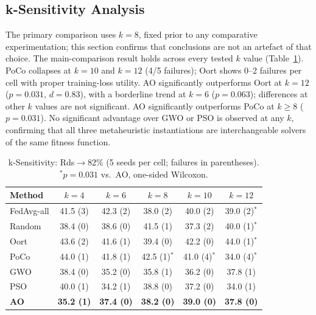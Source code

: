 \documentclass[conference]{IEEEtran}
\begin{document}
\subsection{k-Sensitivity Analysis}
The primary comparison uses $k=8$, fixed prior to any comparative experimentation; this section confirms that conclusions are not an artefact of that choice. The main-comparison result holds across every tested $k$ value (Table~\ref{tab:ksens}). PoCo collapses at $k=10$ and $k=12$ (4/5 failures); Oort shows 0--2 failures per cell with proper training-loss utility. AO significantly outperforms Oort at $k=12$ ($p=0.031$, $d=0.83$), with a borderline trend at $k=6$ ($p=0.063$); differences at other $k$ values are not significant. AO significantly outperforms PoCo at $k\geq8$ ($p=0.031$). No significant advantage over GWO or PSO is observed at any $k$, confirming that all three metaheuristic instantiations are interchangeable solvers of the same fitness function. 
\begin{table}[t]
\centering
\caption{k-Sensitivity: Rds$\to$82\% (5 seeds per cell; failures in parentheses). $^*p=0.031$ vs.\ AO, one-sided Wilcoxon.}
\label{tab:ksens}
\footnotesize
\setlength{\tabcolsep}{3pt}
\begin{tabular}{lccccc}
\toprule
Method & $k=4$ & $k=6$ & $k=8$ & $k=10$ & $k=12$ \\
\midrule
FedAvg-all & 41.5 (3) & 42.3 (2) & 38.0 (2) & 40.0 (2) & 39.0 (2)$^*$ \\
Random     & 38.4 (0) & 38.6 (0) & 41.5 (1) & 37.3 (2) & 40.0 (1)$^*$ \\
Oort       & 43.6 (2) & 41.6 (1) & 39.4 (0) & 42.2 (0) & 44.0 (1)$^*$ \\
PoCo       & 44.0 (1) & 41.8 (1) & 42.5 (1)$^*$ & 41.0 (4)$^*$ & 34.0 (4)$^*$ \\
GWO        & 38.4 (0) & 35.2 (0) & 35.8 (1) & 36.2 (0) & 37.8 (1) \\
PSO        & 40.0 (1) & 34.2 (1) & 38.8 (0) & 37.2 (0) & 34.0 (1) \\
\textbf{AO} & \textbf{35.2 (1)} & \textbf{37.4 (0)} & \textbf{38.2 (0)} & \textbf{39.0 (0)} & \textbf{37.8 (0)} \\
\bottomrule
\end{tabular}
\end{table}
\end{document}
